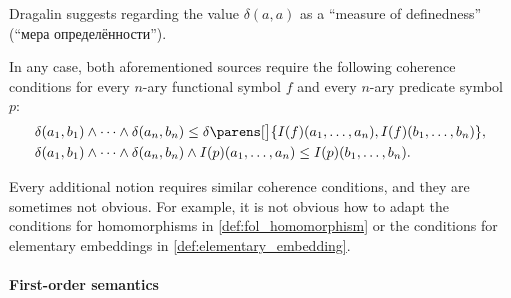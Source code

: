 \begin{remark}
  Dragalin suggests regarding the value \( \delta(a, a) \) as a \enquote{measure of definedness} (\enquote{мера определённости}).

  In any case, both aforementioned sources require the following coherence conditions for every \( n \)-ary functional symbol \( f \) and every \( n \)-ary predicate symbol \( p \):
  \begin{align}
    &\delta(a_1, b_1) \wedge \cdots \wedge \delta(a_n, b_n) \leq \delta\parens[\big]{ I(f)(a_1, \ldots, a_n), I(f)(b_1, \ldots, b_n) }, \label{eq:def:fol_structure/interpretation/function_equality} \\
    &\delta(a_1, b_1) \wedge \cdots \wedge \delta(a_n, b_n) \wedge I(p)(a_1, \ldots, a_n) \leq I(p)(b_1, \ldots, b_n). \label{eq:def:fol_structure/interpretation/predicate_equality}
  \end{align}

  Every additional notion requires similar coherence conditions, and they are sometimes not obvious. For example, it is not obvious how to adapt the conditions for homomorphisms in \cref{def:fol_homomorphism} or the conditions for elementary embeddings in \cref{def:elementary_embedding}.
\end{remark}

\paragraph{First-order semantics}

